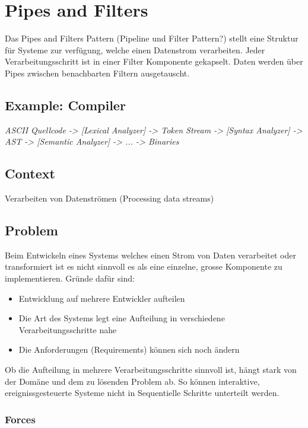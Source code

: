 \section{Pipes and Filters}


Das Pipes and Filters Pattern (Pipeline und Filter Pattern?) stellt eine Struktur für Systeme zur verfügung, welche einen Datenstrom verarbeiten. Jeder Verarbeitungsschritt ist in einer Filter Komponente gekapselt. Daten werden über Pipes zwischen benachbarten Filtern ausgetauscht.

\subsection*{Example: Compiler}
 \textit{ASCII Quellcode -> [Lexical Analyzer] -> Token Stream -> [Syntax Analyzer] -> AST -> [Semantic Analyzer] -> ... -> Binaries}

\subsection*{Context}
Verarbeiten von Datenströmen (Processing data streams)

\subsection*{Problem}


Beim Entwickeln eines Systems welches einen Strom von Daten verarbeitet oder transformiert ist es nicht sinnvoll es als eine einzelne, grosse Komponente zu implementieren. Gründe dafür sind:

\begin{itemize}
	\item Entwicklung auf mehrere Entwickler aufteilen
	\item Die Art des Systems legt eine Aufteilung in verschiedene Verarbeitungsschritte nahe
	\item Die Anforderungen (Requirements) können sich noch ändern
\end{itemize}

Ob die Aufteilung in mehrere Verarbeitungsschritte sinnvoll ist, hängt stark von der Domäne und dem zu lösenden Problem ab. So können interaktive, ereignissgesteuerte Systeme nicht in Sequentielle Schritte unterteilt werden.

\subsubsection*{Forces}

